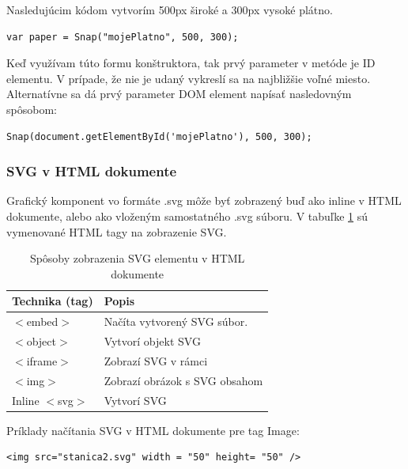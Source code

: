 Nasledujúcim kódom vytvorím 500px široké a 300px vysoké plátno.

\begin{lstlisting}
var paper = Snap("mojePlatno", 500, 300);
\end{lstlisting}

Keď využívam túto formu konštruktora, tak prvý parameter v metóde je ID elementu. V prípade, že nie je udaný vykreslí sa na najbližšie voľné miesto. Alternatívne sa dá prvý parameter DOM element napísať nasledovným spôsobom: 
\begin{lstlisting}
Snap(document.getElementById('mojePlatno'), 500, 300);
\end{lstlisting}



\subsubsection{\acs*{SVG} v HTML dokumente}

Grafický komponent vo formáte .svg môže byť zobrazený buď ako inline v HTML dokumente, alebo ako vloženým samostatného .svg súboru. 
V tabuľke \ref{vytvorenie:SVG} sú vymenované HTML tagy na zobrazenie SVG. 


\begin{table}[H]
	\begin{center}
		\begin{tabular}{|l|l|}
			\hline \textbf{Technika (tag)} & \textbf{Popis} \\ 
		
			\hline $<$embed$>$ & Načíta vytvorený SVG súbor.  \\ 
			\hline $<$object$>$ & Vytvorí objekt SVG  \\ 
			\hline $<$iframe$>$ & Zobrazí SVG v rámci  \\ 
            \hline $<$img$>$ & Zobrazí obrázok s SVG obsahom   \\
			\hline Inline $<$svg$>$ & Vytvorí SVG   \\ 
             
			\hline 
		\end{tabular} 
	\end{center}
	\caption{Spôsoby zobrazenia SVG elementu v HTML dokumente}
	\label{vytvorenie:SVG}
\end{table}


Príklady načítania SVG v HTML dokumente pre tag Image:
\begin{lstlisting}
<img src="stanica2.svg" width = "50" height= "50" />
\end{lstlisting}


